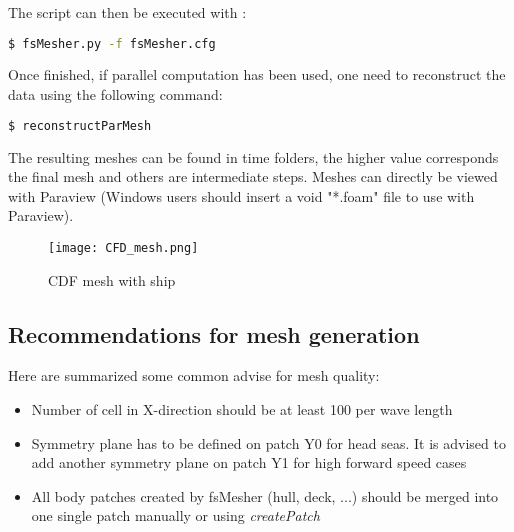The script can then be executed with :
\begin{lstlisting}[language=bash]
$ fsMesher.py -f fsMesher.cfg
\end{lstlisting}

Once finished, if parallel computation has been used, one need to reconstruct the data using the following command:
\begin{lstlisting}[language=bash]
$ reconstructParMesh
\end{lstlisting}

The resulting meshes can be found in time folders, the higher value corresponds the final mesh and others are intermediate steps. Meshes can directly be viewed with Paraview (Windows users should insert a void "*.foam" file to use with Paraview).

\begin{figure}[htbp]
\begin{center}
\texttt{[image: CFD\_mesh.png]}
\end{center}
\caption{CDF mesh with ship}
\label{cfd_mesh} 
\end{figure}


\subsection{Recommendations for mesh generation}

Here are summarized some common advise for mesh quality:
\begin{itemize}
\item Number of cell in X-direction should be at least 100 per wave length
\item Symmetry plane has to be defined on patch Y0 for head seas. It is advised to add another symmetry plane on patch Y1 for high forward speed cases
\item All body patches created by fsMesher (hull, deck, ...) should be merged into one single patch manually or using \emph{createPatch}
\end{itemize}


\cite{Shabana1989}